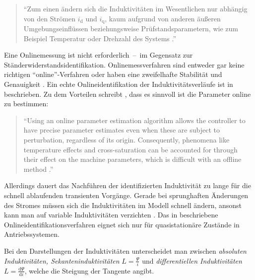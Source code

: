 \documentclass[conference,twocolumn]{IEEEtran}
\newcommand{\x}[1]{\mathrm{#1}}
\begin{document}
\begin{quote}
\enquote{Zum einen ändern sich die Induktivitäten im Wesentlichen nur abhängig von den Strömen $i_\x{d}$ und $i_\x{q}$, kaum aufgrund von anderen äußeren Umgebungseinflüssen beziehungsweise Prüfstandsparametern, wie zum Beispiel Temperatur oder Drehzahl des Systems \autocite[S.~79]{Kellner2012}.}
\end{quote}

Eine Onlinemessung ist nicht erforderlich~--~im Gegensatz zur Ständerwiderstandsidentifikation.
Onlinemessverfahren sind entweder gar keine richtigen \enquote{online}-Verfahren oder haben eine zweifelhafte Stabilität und Genauigkeit \autocite{underwood_online_2010}.
Ein echte Onlineidentifikation der Induktivitätsverläufe ist in \autocite{underwood_online_2010} beschrieben.
Zu dem Vorteilen schreibt \textcite{underwood_online_2010}, dass es sinnvoll ist die Parameter online zu bestimmen:

\begin{quote}
\enquote{Using an online parameter estimation algorithm allows the controller to have precise parameter estimates even when these are subject to perturbation, regardless of its origin. Consequently, phenomena like temperature effects and cross-saturation can be accounted for through their effect on the machine parameters, which is difficult with an offline method \autocite[S.~1]{underwood_online_2010}.}
\end{quote}

Allerdings dauert das Nachführen der identifizierten Induktivität zu lange für die schnell ablaufenden transienten Vorgänge.
Gerade bei sprunghaften Änderungen des Stromes müssen sich die Induktivitäten im Modell schnell ändern, ansonst kann man auf variable Induktivitäten verzichten \autocite{Kellner2012}.
Das in \autocite{underwood_online_2010} beschriebene Onlineidentifikationsverfahren eignet sich nur für quasistationäre Zustände in Antriebssystemen.

Bei den Darstellungen der Induktivitäten unterscheidet man zwischen \emph{absoluten Induktivitäten, Sekanteninduktivitäten} $L = \frac{\Psi}{i}$ und \emph{differentiellen Induktivitäten} $L = \frac{\x{d}\Psi}{\x{d}i}$, welche die Steigung der Tangente angibt.
\end{document}
